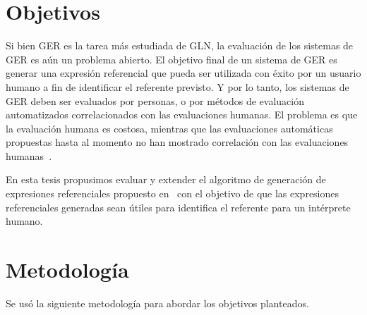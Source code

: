 \section{Objetivos}
\label{objetivos}

Si bien GER es la tarea m\'as estudiada de GLN, la evaluaci\'on de los sistemas de GER es a\'un un problema abierto. El objetivo final de un sistema de GER es generar una expresi\'on referencial que pueda ser utilizada con \'exito por un usuario humano a fin de identificar el referente previsto. Y por lo tanto, los sistemas de GER deben ser evaluados por personas, o por m\'etodos de evaluaci\'on automatizados correlacionados con las evaluaciones humanas. El problema es que la evaluaci\'on humana es costosa, mientras que las evaluaciones autom\'aticas propuestas hasta al momento no han mostrado correlaci\'on con las evaluaciones humanas~\cite{Reiter09}.

En esta tesis propusimos evaluar y extender el algoritmo de generaci\'on de expresiones referenciales propuesto en~\cite{Areces2008} con el objetivo de que las expresiones referenciales generadas sean \'utiles para identifica el referente para un int\'erprete humano. 

\section{Metodolog\'ia}

Se us\'o la siguiente metodolog\'ia para abordar los objetivos planteados.  


